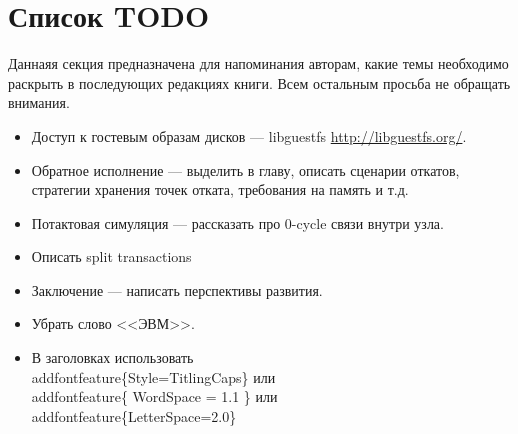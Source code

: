 \section*{Список TODO}

Даннаяя секция предназначена для напоминания авторам, какие темы необходимо раскрыть в последующих редакциях книги. Всем остальным просьба не обращать внимания.

\begin{itemize}
    \item Доступ к гостевым образам дисков --- libguestfs \url{http://libguestfs.org/}.
    \item Обратное исполнение --- выделить в главу, описать сценарии откатов, стратегии хранения точек отката, требования на память и т.д.
    \item Потактовая симуляция --- рассказать про 0-cycle связи внутри узла.
    \item Описать split transactions
    \item Заключение --- написать перспективы развития.
    \item Убрать слово <<ЭВМ>>.
    \item В заголовках использовать \\addfontfeature\{Style=TitlingCaps\} или \\addfontfeature\{ WordSpace = 1.1 \} или  \\addfontfeature\{LetterSpace=2.0\}


\end{itemize}

